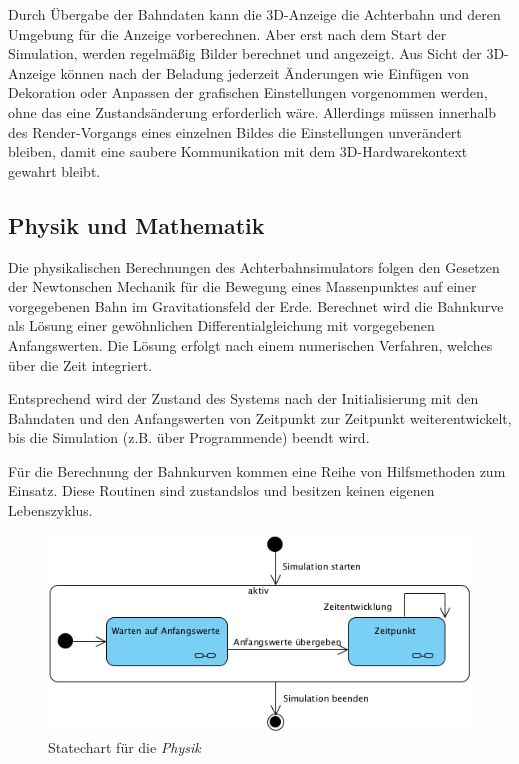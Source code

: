 Durch Übergabe der Bahndaten kann die 3D-Anzeige die Achterbahn und deren Umgebung für die Anzeige vorberechnen.
Aber erst nach dem Start der Simulation, werden regelmäßig Bilder berechnet und angezeigt. Aus Sicht der 3D-Anzeige
können nach der Beladung jederzeit Änderungen wie Einfügen von Dekoration oder Anpassen der grafischen Einstellungen
vorgenommen werden, ohne das eine Zustandsänderung erforderlich wäre. Allerdings müssen innerhalb des Render-Vorgangs
eines einzelnen Bildes die Einstellungen unverändert bleiben, damit eine saubere Kommunikation mit dem 3D-Hardwarekontext
gewahrt bleibt.

\subsection{Physik und Mathematik}

Die physikalischen Berechnungen des Achterbahnsimulators folgen den Gesetzen der Newtonschen Mechanik für die Bewegung
eines Massenpunktes auf einer vorgegebenen Bahn im Gravitationsfeld der Erde. Berechnet wird die Bahnkurve als Lösung
einer gewöhnlichen Differentialgleichung mit vorgegebenen Anfangswerten. Die Lösung erfolgt nach einem numerischen
Verfahren, welches über die Zeit integriert.

Entsprechend wird der Zustand des Systems nach der Initialisierung mit den Bahndaten und den Anfangswerten von Zeitpunkt
zur Zeitpunkt weiterentwickelt, bis die Simulation (z.B. über Programmende) beendt wird.

Für die Berechnung der Bahnkurven kommen eine Reihe von Hilfsmethoden zum Einsatz. Diese Routinen sind zustandslos und
besitzen keinen eigenen Lebenszyklus.

\begin{figure}
\includegraphics[width=\linewidth]{bilder/statechart_physics}
\caption{Statechart für die \textit{Physik}}
\end{figure}

